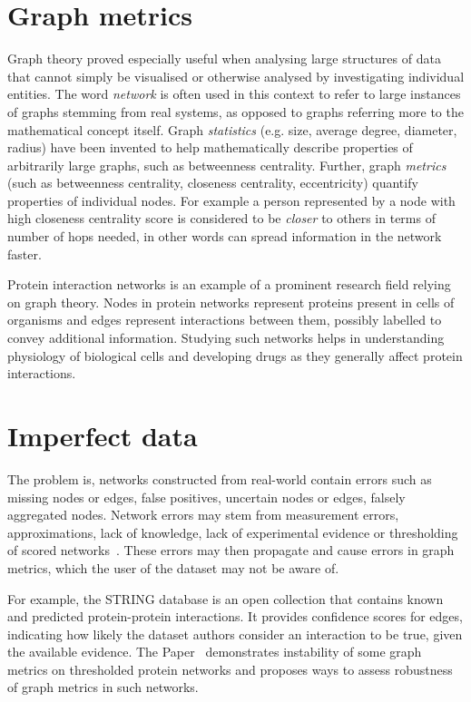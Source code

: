 \section{Graph metrics}

Graph theory proved especially useful when analysing large structures of data that cannot simply be visualised or otherwise analysed by investigating individual entities.
The word \textsl{network} is often used in this context to refer to large instances of graphs stemming from real systems, as opposed to graphs referring more to the mathematical concept itself.
Graph \textsl{statistics} (e.g. size, average degree, diameter, radius) have been invented to help mathematically describe properties of arbitrarily large graphs, such as betweenness centrality.
Further, graph \textsl{metrics} (such as betweenness centrality, closeness centrality, eccentricity) quantify properties of individual nodes.
For example a person represented by a node with high closeness centrality score is considered to be \textsl{closer} to others in terms of number of hops needed, in other words can spread information in the network faster.

Protein interaction networks is an example of a prominent research field relying on graph theory.
Nodes in protein networks represent proteins present in cells of organisms and edges represent interactions between them, possibly labelled to convey additional information.
Studying such networks helps in understanding physiology of biological cells and developing drugs as they generally affect protein interactions.


\section{Imperfect data}

The problem is, networks constructed from real-world contain errors such as missing nodes or edges, false positives, uncertain nodes or edges, falsely aggregated nodes.
Network errors may stem from measurement errors, approximations, lack of knowledge, lack of experimental evidence or thresholding of scored networks~\cite{Wang2012,MarsdenNetworkDataMeasurement1990,JonesChallengesLimitationsQuantifying2010}.
These errors may then propagate and cause errors in graph metrics, which the user of the dataset may not be aware of. 

For example, the STRING database\cite{Szklarczyk2019} is an open collection that contains known and predicted protein-protein interactions.
It provides confidence scores for edges, indicating how likely the dataset authors consider an interaction to be true, given the available evidence.
The Paper~\cite{Bozhilova2019} demonstrates instability of some graph metrics on thresholded protein networks and proposes ways to assess robustness of graph metrics in such networks.


